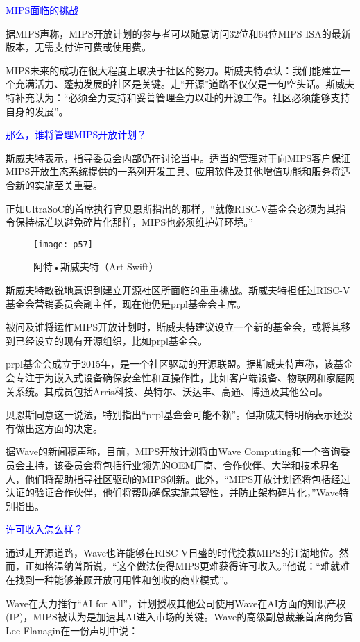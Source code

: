 \documentclass[utf8]{book}
\begin{document}
\textcolor{blue}{MIPS面临的挑战}

据MIPS声称，MIPS开放计划的参与者可以随意访问32位和64位MIPS ISA的最新版本，无需支付许可费或使用费。

MIPS未来的成功在很大程度上取决于社区的努力。斯威夫特承认：我们能建立一个充满活力、蓬勃发展的社区是关键。走“开源”道路不仅仅是一句空头话。斯威夫特补充认为：“必须全力支持和妥善管理全力以赴的开源工作。社区必须能够支持自身的发展”。

\textcolor{blue}{那么，谁将管理MIPS开放计划？}

斯威夫特表示，指导委员会内部仍在讨论当中。适当的管理对于向MIPS客户保证 MIPS开放生态系统提供的一系列开发工具、应用软件及其他增值功能和服务将适合新的实施至关重要。

正如UltraSoC的首席执行官贝恩斯指出的那样，“就像RISC-V基金会必须为其指令保持标准以避免碎片化那样，MIPS也必须维护好环境。”

	\begin{figure}[H]
	\centering
	\texttt{[image: p57]}
	\caption{阿特•斯威夫特（Art Swift）}
	\end{figure}


斯威夫特敏锐地意识到建立开源社区所面临的重重挑战。斯威夫特担任过RISC-V基金会营销委员会副主任，现在他仍是prpl基金会主席。

被问及谁将运作MIPS开放计划时，斯威夫特建议设立一个新的基金会，或将其移到已经设立的现有开源组织，比如prpl基金会。

prpl基金会成立于2015年，是一个社区驱动的开源联盟。据斯威夫特声称，该基金会专注于为嵌入式设备确保安全性和互操作性，比如客户端设备、物联网和家庭网关系统。其成员包括Arris科技、英特尔、沃达丰、高通、博通及其他公司。

贝恩斯同意这一说法，特别指出“prpl基金会可能不赖”。但斯威夫特明确表示还没有做出这方面的决定。

据Wave的新闻稿声称，目前，MIPS开放计划将由Wave Computing和一个咨询委员会主持，该委员会将包括行业领先的OEM厂商、合作伙伴、大学和技术界名人，他们将帮助指导社区驱动的MIPS创新。此外，“MIPS开放计划还将包括经过认证的验证合作伙伴，他们将帮助确保实施兼容性，并防止架构碎片化，”Wave特别指出。

\textcolor{blue}{许可收入怎么样？}

通过走开源道路，Wave也许能够在RISC-V日盛的时代挽救MIPS的江湖地位。然而，正如格温纳普所说，“这个做法使得MIPS更难获得许可收入。”他说：“难就难在找到一种能够兼顾开放可用性和创收的商业模式”。

Wave在大力推行“AI for All”，计划授权其他公司使用Wave在AI方面的知识产权(IP)，MIPS被认为是加速其AI进入市场的关键。Wave的高级副总裁兼首席商务官Lee Flanagin在一份声明中说：
\end{document}
